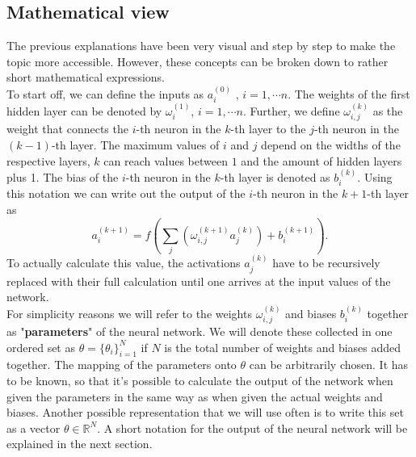 \subsection{Mathematical view}
The previous explanations have been very visual and step by step to make the topic more accessible. However, these concepts can be broken down to rather short mathematical expressions.\\
To start off, we can define the inputs as $a_i^{(0)}$ , $i =  1, \dotsb n$. The weights of the first hidden layer can be denoted by $\omega_{i}^{(1)}$, $i =  1, \dotsb n$. Further, we define $\omega_{i,j}^{(k)}$ as the weight that connects the $i$-th neuron in the $k$-th layer to the $j$-th neuron in the $(k-1)$-th layer. The maximum values of $i$ and $j$ depend on the widths of the respective layers, $k$ can reach values between $1$ and the amount of hidden layers plus 1. The bias of the $i$-th neuron in the $k$-th layer is denoted as $b_i^{(k)}$. Using this notation we can write out the output of the $i$-th neuron in the $k+1$-th layer as
\begin{equation}
	a_i^{(k+1)} = f\left(\sum_j \left(\omega_{i,j}^{(k+1)}a_j^{(k)}\right) + b_i^{(k+1)}\right).
\end{equation}
To actually calculate this value, the activations $a_j^{(k)}$ have to be recursively replaced with their full calculation until one arrives at the input values of the network.\\
For simplicity reasons we will refer to the weights $\omega_{i,j}^{(k)}$ and biases $b_i^{(k)}$ together as "\textbf{parameters}" of the neural network. We will denote these collected in one ordered set as $\theta = \{\theta_i\}_{i=1}^{N}$ if $N$ is the total number of weights and biases added together. The mapping of the parameters onto $\theta$ can be arbitrarily chosen. It has to be known, so that it's possible to calculate the output of the network when given the parameters in the same way as when given the actual weights and biases. Another possible representation that we will use often is to write this set as a vector $\theta \in \mathbb{R}^N$. A short notation for the output of the neural network will be explained in the next section.
